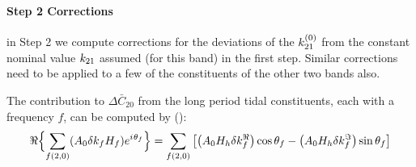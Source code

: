 \paragraph{Step 2 Corrections}\label{par:step2-corr-earth-tides}
in Step 2 we compute corrections for the deviations of the 
$k ^{(0)}_{21}$ from the constant nominal value $k _{21}$ 
assumed (for this band) in the first step. Similar corrections need to be 
applied to a few of the constituents of the other two bands also.

The contribution to $\Delta \bar{C}_{20}$ from the long period tidal 
constituents, each with a frequency $f$, can be computed by (\cite{iers2010}):
\begin{equation}
  \Re \Bigl\{ \sum _{f(2,0)}(A_0 \delta k_f H_f) e^{{i\mkern1mu} \theta _f} \Bigr\} = 
    \sum_{f(2,0)} \left[ \left(A_0 H_h \delta k^\Re _f \right) \cos \theta _f 
      - \left(A_0 H_h \delta k^\Im _f \right) \sin \theta _f 
    \right]
  \label{eq:iers1068a}
\end{equation}

